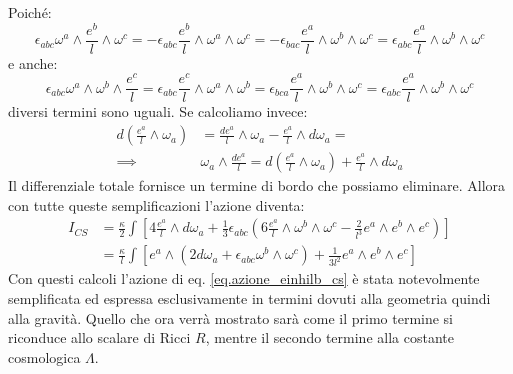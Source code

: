 Poiché:
\begin{equation*}
    \epsilon_{abc}\omega^a \wedge \frac{e^b}{l}\wedge \omega^c = - \epsilon_{abc}\frac{e^b}{l}\wedge\omega^a\wedge\omega^c = - \epsilon_{bac}\frac{e^a}{l}\wedge \omega^b\wedge\omega^c = \epsilon_{abc}\frac{e^a}{l}\wedge\omega^b\wedge\omega^c
\end{equation*}
e anche:
\begin{equation*}
    \epsilon_{abc}\omega^a\wedge\omega^b\wedge\frac{e^c}{l} = \epsilon_{abc}\frac{e^c}{l}\wedge\omega^a\wedge\omega^b = \epsilon_{bca}\frac{e^a}{l}\wedge\omega^b\wedge\omega^c = \epsilon_{abc}\frac{e^a}{l}\wedge\omega^b\wedge\omega^c
\end{equation*}
diversi termini sono uguali. Se calcoliamo invece:
\begin{align*}
    d(\frac{e^a}{l}\wedge\omega_a)& = \frac{de^a}{l}\wedge\omega_a - \frac{e^a}{l}\wedge d\omega_a = \\
    \implies& \omega_a \wedge \frac{de^a}{l} = d(\frac{e^a}{l}\wedge\omega_a) + \frac{e^a}{l}\wedge d\omega_a
\end{align*}
Il differenziale totale fornisce un termine di bordo che possiamo eliminare. Allora con tutte queste semplificazioni l'azione diventa:
\begin{align}
    I_{CS} &= \frac{\kappa}{2}\int \left[ 4 \frac{e^a}{l}\wedge d\omega_a + \frac{1}{3}\epsilon_{abc}(6\frac{e^a}{l}\wedge\omega^b\wedge\omega^c - \frac{2}{l^3}e^a\wedge e^b\wedge e^c) \right] \nonumber \\
    &= \frac{\kappa}{l}\int \left[ e^a\wedge(2d\omega_a + \epsilon_{abc}\omega^b \wedge\omega^c) + \frac{1}{3l^2}e^a\wedge e^b\wedge e^c\right] \label{eq.azione_einhilb_cs_intermed}
\end{align}
Con questi calcoli l'azione di eq. \ref{eq.azione_einhilb_cs} è stata notevolmente semplificata ed espressa esclusivamente in termini dovuti alla geometria quindi alla gravità. Quello che ora verrà mostrato sarà come il primo termine si riconduce allo scalare di Ricci $R$, mentre il secondo termine alla costante cosmologica $\Lambda$.

